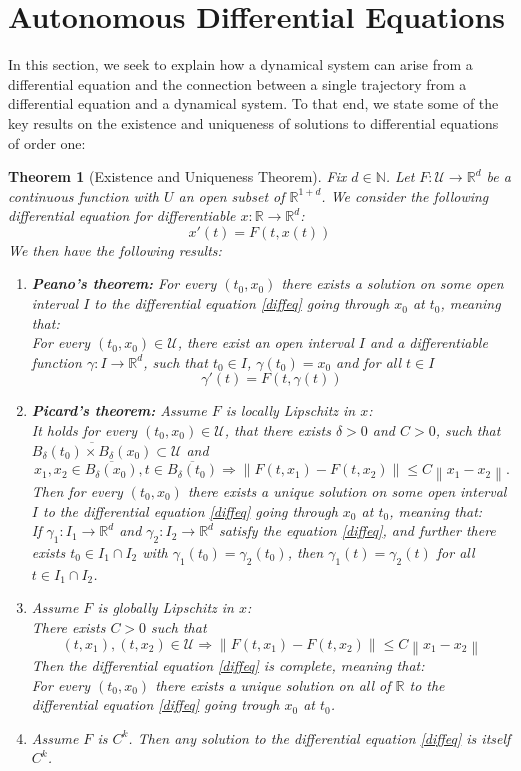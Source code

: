 \documentclass[11pt, a4paper]{memoir}
\theoremstyle{break}
\newtheorem{thm}{Theorem}
\theoremstyle{break}
\theoremstyle{nonumberplain}
\newcommand{\mN}{\mathbb{N}}
\newcommand{\mR}{\mathbb{R}}
\newcommand{\norm}[1]{\left\lVert#1\right\rVert}
\begin{document}
\section{Autonomous Differential Equations}
In this section, we seek to explain how a dynamical system can arise from a differential equation and the connection between a single trajectory from a differential equation and a dynamical system. To that end, we state some of the key results on the existence and uniqueness of solutions to differential equations of order one:
\begin{thm}[Existence and Uniqueness Theorem]\label{ThmDiffEq}
Fix $d\in \mN$. Let $F:\mathcal{U}\to\mR^d$ be a continuous function with $U$ an open subset of $\mR^{1+d}$. We consider the following differential equation for differentiable $x:\mR\to\mR^{d}$:
\begin{equation}\label{diffeq}
x'(t)=F\left(t,x(t)\right)
\end{equation}
We then have the following results:
\begin{enumerate}[label=(\roman*)]
	\item \textbf{Peano's theorem:} For every $(t_0,x_0)$ there exists a solution on some open interval $I$ to the differential equation \ref{diffeq} going through $x_0$ at $t_0$, meaning that:\\
	For every $(t_0,x_0)\in \mathcal{U}$, there exist an open interval $I$ and a differentiable function $\gamma: I\to \mR^d$, such that $t_0\in I$, $\gamma(t_0)=x_0$ and for all $t\in I$
		$$\gamma'(t)=F\left(t,\gamma(t)\right)$$
	\item \textbf{Picard's theorem:} Assume $F$ is locally Lipschitz in $x$:\\[5pt]
	It holds for every $(t_0,x_0)\in \mathcal{U}$, that there exists $\delta>0$ and $C>0$, such that $\overline{B_\delta(t_0)\times B_\delta(x_0)}\subset \mathcal{U}$ and
	$$x_1,x_2\in \overline{B_\delta(x_0)}, t\in \overline{B_\delta(t_0)}\Rightarrow \norm{F(t,x_1)-F(t,x_2)}\leqslant C\norm{x_1-x_2}.$$
	Then for every $(t_0,x_0)$ there exists a unique solution on some open interval $I$ to the differential equation \ref{diffeq} going through $x_0$ at $t_0$, meaning that:\\
	If $\gamma_1: I_1\to\mR^d$ and $\gamma_2:I_2\to\mR^d$ satisfy the equation \ref{diffeq}, and further there exists $t_0\in I_1\cap I_2$ with $\gamma_1(t_0)=\gamma_2(t_0)$, then $\gamma_1(t)=\gamma_2(t)$ for all $t\in I_1\cap I_2$.
	\item Assume $F$ is globally Lipschitz in $x$:\\[5pt]
	There exists $C>0$ such that
	$$(t,x_1),(t,x_2)\in \mathcal{U}\Rightarrow \norm{F(t,x_1)-F(t,x_2)}\leq C\norm{x_1-x_2}$$
	Then the differential equation \ref{diffeq} is complete, meaning that:\\
	For every $(t_0,x_0)$ there exists a unique solution on all of $\mR$ to the differential equation \ref{diffeq} going trough $x_0$ at $t_0$.
	\item Assume $F$ is $C^k$. Then any solution to the differential equation \ref{diffeq} is itself $C^k$.
\end{enumerate}
\end{thm}
\end{document}
